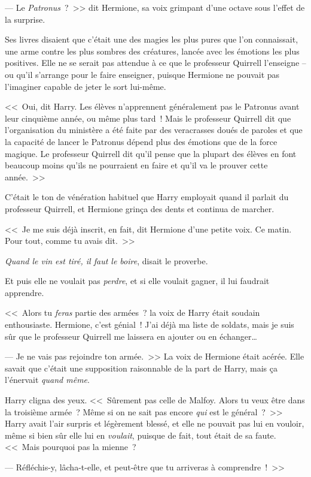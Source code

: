 --- Le \emph{Patronus}~?~>> dit Hermione, sa voix grimpant d'une octave sous l'effet de la surprise.

Ses livres disaient que c'était une des magies les plus pures que l'on connaissait, une arme contre les plus sombres des créatures, lancée avec les émotions les plus positives. Elle ne se serait pas attendue à ce que le professeur Quirrell l'enseigne -- ou qu'il s'arrange pour le faire enseigner, puisque Hermione ne pouvait pas l'imaginer capable de jeter le sort lui-même.

<<~Oui, dit Harry. Les élèves n'apprennent généralement pas le Patronus avant leur cinquième année, ou même plus tard~! Mais le professeur Quirrell dit que l'organisation du ministère a été faite par des veracrasses doués de paroles et que la capacité de lancer le Patronus dépend plus des émotions que de la force magique. Le professeur Quirrell dit qu'il pense que la plupart des élèves en font beaucoup moins qu'ils ne pourraient en faire et qu'il va le prouver cette année.~>>

C'était le ton de vénération habituel que Harry employait quand il parlait du professeur Quirrell, et Hermione grinça des dents et continua de marcher.

<<~Je me suis déjà inscrit, en fait, dit Hermione d'une petite voix. Ce matin. Pour tout, comme tu avais dit.~>>

\emph{Quand le vin est tiré, il faut le boire}, disait le proverbe.

Et puis elle ne voulait pas \emph{perdre}, et si elle voulait gagner, il lui faudrait apprendre.

<<~Alors tu \emph{feras} partie des armées~? la voix de Harry était soudain enthousiaste. Hermione, c'est génial~! J'ai déjà ma liste de soldats, mais je suis sûr que le professeur Quirrell me laissera en ajouter ou en échanger…

--- Je ne vais pas rejoindre ton armée.~>> La voix de Hermione était acérée. Elle savait que c'était une supposition raisonnable de la part de Harry, mais ça l'énervait \emph{quand même}.

Harry cligna des yeux. <<~Sûrement pas celle de Malfoy. Alors tu veux être dans la troisième armée~? Même si on ne sait pas encore \emph{qui} est le général~?~>> Harry avait l'air surpris et légèrement blessé, et elle ne pouvait pas lui en vouloir, même si bien sûr elle lui en \emph{voulait}, puisque de fait, tout était de sa faute. <<~Mais pourquoi pas la mienne~?

--- Réfléchis-y, lâcha-t-elle, et peut-être que tu arriveras à comprendre~!~>>

